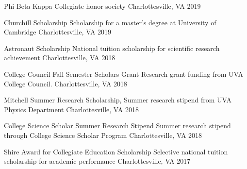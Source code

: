 



\begin{cvhonors}
  \cvhonor
    {Phi Beta Kappa} %
    {Collegiate honor society} %
    {Charlottesville, VA} %
    {2019} %

  \cvhonor
    {Churchill Scholarship} %
    {Scholarship for a master’s degree at University of Cambridge} %
    {Charlottesville, VA} %
    {2019} %
    
  \cvhonor
    {Astronaut Scholarship} %
    {National tuition scholarship for scientific research achievement} %
    {Charlottesville, VA} %
    {2018} %
    
  \cvhonor
    {College Council Fall Semester Scholars Grant} %
    {Research grant funding from UVA College Council.} %
    {Charlottesville, VA} %
    {2018} %
    
  \cvhonor
    {Mitchell Summer Research Scholarship,} %
    {Summer research stipend from UVA Physics Department} %
    {Charlottesville, VA} %
    {2018} %
    
  \cvhonor
    { College Science Scholar Summer Research Stipend} %
    {Summer research stipend through College Science Scholar Program} %
    {Charlottesville, VA} %
    {2018} %
    
  \cvhonor
    {Shire Award for Collegiate Education Scholarship} %
    {Selective national tuition scholarship for academic performance} %
    {Charlottesville, VA} %
    {2017} %


\end{cvhonors}
